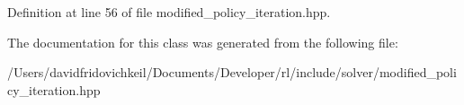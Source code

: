 Definition at line 56 of file modified\+\_\+policy\+\_\+iteration.\+hpp.



The documentation for this class was generated from the following file\+:\begin{DoxyCompactItemize}
\item 
/\+Users/davidfridovichkeil/\+Documents/\+Developer/rl/include/solver/modified\+\_\+policy\+\_\+iteration.\+hpp\end{DoxyCompactItemize}

